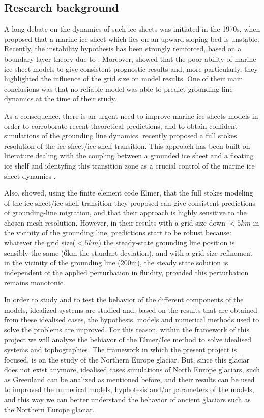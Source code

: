 \documentclass[a4paper,12pt]{article}
\begin{document}
\subsection{Research background}
A long debate on the dynamics of such ice sheets was initiated in the 1970s, when \cite{weertman1974stability} proposed that a marine ice sheet which lies on an upward-sloping bed is unstable. Recently, the instability hypothesis has been strongly reinforced, based on a boundary-layer theory due to \cite{schoof2007ice}. Moreover, \cite{vieli2005assessing} showed that the poor ability of marine ice-sheet models to give consistent prognostic results and, more particularly, they highlighted the influence of the grid size on model results. One of their main conclusions was that no reliable model was able to predict grounding line dynamics at the time of their study.

As a consequence, there is an urgent need to improve marine ice-sheets models in order to corroborate recent theoretical predictions, and to obtain confident simulations of the grounding line dynamics. \cite{durand2009marine} recently proposed a full stokes resolution of the ice-sheet/ice-shelf transition. This approach has been built on literature dealing with the coupling between a grounded ice sheet and a floating ice shelf and identyfing this transition zone as a crucial control of the marine ice sheet dynamics \cite[]{weertman1974stability,van1985response,chugunov1996modelling,hindmarsh1996stability,vieli2005assessing,schoof2007ice,schoof2007marine}.

Also, \cite{durand2009full} showed, using the finite element code Elmer, that the full stokes modeling of the ice-sheet/ice-shelf transition they proposed can give consistent predictions of grounding-line migration, and that their approach is highly sensitive to the chosen mesh resolution. However, in their results with a grid size down $<5 km$ in the vicinity of the grounding line, predictions start to be robust because: whatever the grid size($<5km$) the steady-state grounding line position is sensibly the same (6km the standart deviation), and with a grid-size refinement in the vicinity of the grounding line (200m), the steady state solution is independent of the applied perturbation in fluidity, provided this perturbation remains monotonic.

In order to study and to test the behavior of the different components of the models, idealized systems are studied and, based on the results that are obtained from these idealised cases, the hypothesis, models and numerical methods used to solve the problems are improved. For this reason, within the framework of this project we will analyze the behiavor of the Elmer/Ice method to solve idealised systems and tophographies. The framework in which the present project is focused, is on the study of the Northern Europe glaciar. But, since this glaciar does not exist anymore, idealised cases simulations of North Europe glaciars, such as Greenland can be analized as mentioned before, and their results can be used to improved the numerical models, hyphotesis and/or parameters of the models, and this way we can better understand the behavior of ancient glaciars such as the Northern Europe glaciar.
\end{document}
